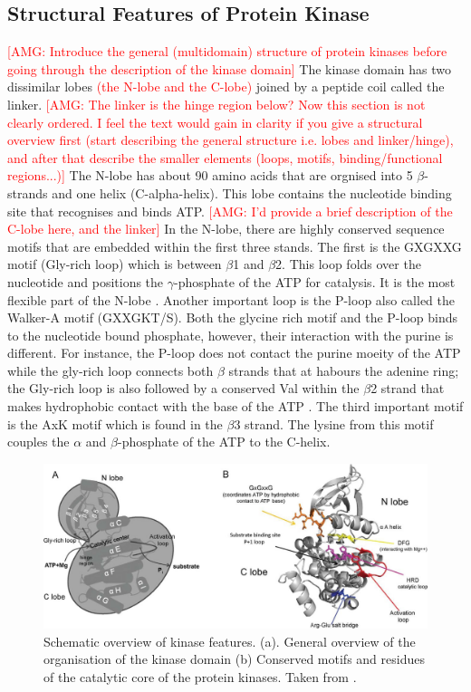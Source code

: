 \documentclass[a4paper, 11pt]{article}
\newcommand{\redcomment}[1]{\textcolor{red}{[#1]}} %
\newcommand{\redinsert}[1]{\textcolor{red}{#1}} %
\begin{document}
\subsection*{Structural Features of Protein Kinase}
\redcomment{AMG: Introduce the general (multidomain) structure of protein kinases before going through the description of the kinase domain}
The kinase domain has two dissimilar lobes \redinsert{(the N-lobe and the C-lobe)} joined by a peptide coil called the linker. \redcomment{AMG: The linker is the hinge region below? Now this section is not clearly ordered. I feel the text would gain in clarity if you give a structural overview first (start describing the general structure i.e. lobes and linker/hinge), and after that describe the smaller elements (loops, motifs, binding/functional regions...)} The N-lobe has about 90 amino acids that are orgnised into 5 $\beta$-strands and one helix (C-alpha-helix). This lobe contains the nucleotide binding site that recognises and binds ATP. \redcomment{AMG: I'd provide a brief description of the C-lobe here, and the linker}
In the N-lobe, there are highly conserved sequence motifs that are embedded within the first three stands. The first is the GXGXXG motif (Gly-rich loop) which is between $\beta$1 and $\beta$2. This loop folds over the nucleotide and positions the  $\gamma$-phosphate of the ATP for catalysis. It is the most flexible part of the N-lobe \cite{taylor2011protein}. Another important loop is the P-loop also called the Walker-A motif (GXXGKT/S). Both the glycine rich motif and the P-loop binds to the nucleotide bound phosphate, however, their interaction with the purine is different. For instance, the P-loop does not contact the purine moeity of the ATP while the gly-rich loop connects both $\beta$ strands that at habours the adenine ring; the Gly-rich loop is also followed by a conserved Val within the $\beta$2 strand that makes hydrophobic contact with the base of the ATP \cite{fabbro2015ten}. The third important motif is the AxK motif which is found in the $\beta$3 strand. The lysine from this motif couples the $\alpha$ and $\beta$-phosphate of the ATP to the C-helix. \\
\begin{figure}[H]
	\includegraphics[width=\linewidth]{figures/kinasedom.jpg}
	\centering
	\caption{Schematic overview of kinase features. (a). General overview of the organisation of the kinase domain (b) Conserved motifs and residues of the catalytic core of the protein kinases. Taken from \cite{lorenzen2014hdx}.}
	\label{kinasedoms}
\end{figure}
\end{document}
